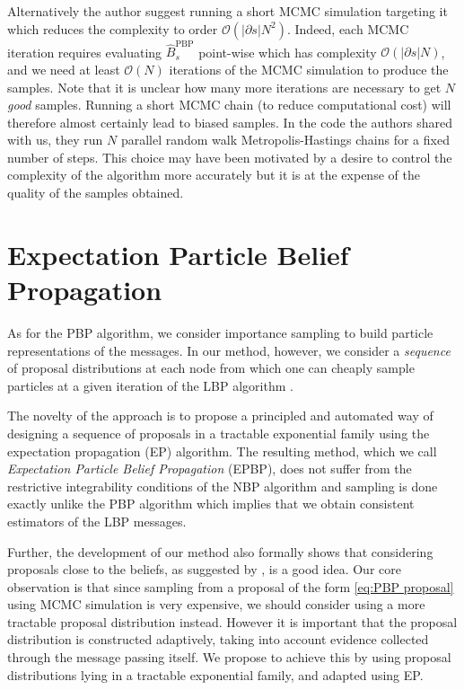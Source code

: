 Alternatively the author suggest running a short MCMC simulation targeting it which reduces the complexity to order $\mathcal O {(|\partial {s}|N^{2})}$. Indeed, each MCMC iteration requires evaluating $\widehat B_{s}^{\text{PBP}}$ point-wise which has complexity $\mathcal O {(|\partial{s}|N)}$, and we need at least $\mathcal{O}(N)$ iterations of the MCMC simulation to produce the samples. Note that it is unclear how many more iterations are necessary to get $N$ \emph{good} samples. Running a short MCMC chain (to reduce computational cost) will therefore almost certainly lead to biased samples. In the code the authors shared with us, they run $N$ parallel random walk Metropolis-Hastings chains \citep[chapter 6]{robert04} for a fixed number of steps. This choice may have been motivated by a desire to control the complexity of the algorithm more accurately but it is at the expense of the quality of the samples obtained.

\section{\label{sec:EPBP}Expectation Particle Belief Propagation}
As for the PBP algorithm, we consider importance sampling to build particle representations of the messages. In our method, however, we consider a \emph{sequence} of proposal distributions at each node from which one can cheaply sample particles at a given iteration of the LBP algorithm \citep{lienart15}.

The novelty of the approach is to propose a principled and automated way of designing a sequence of proposals in a tractable exponential family using the expectation propagation (EP) algorithm. The resulting method, which we call \emph{Expectation Particle Belief Propagation} (EPBP), does not suffer from the restrictive integrability conditions of the NBP algorithm and sampling is done exactly unlike the PBP algorithm which implies that we obtain consistent estimators of the LBP messages.

Further, the development of our method also formally shows that considering proposals close to the beliefs, as suggested by \cite{ihler09}, is a good idea.  Our core observation is that since sampling from a proposal of the form \eqref{eq:PBP proposal} using MCMC simulation is very expensive, we should consider using a more tractable proposal distribution instead. However it is important that the proposal distribution is constructed adaptively, taking into account evidence collected through the message passing itself. We propose to achieve this by using proposal distributions lying in a tractable exponential family, and adapted using EP.

